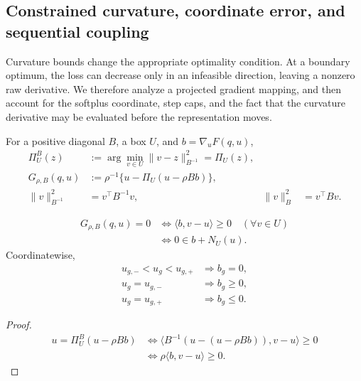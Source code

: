 \subsection{Constrained curvature, coordinate error, and sequential coupling}
Curvature bounds change the appropriate optimality condition. At a boundary optimum, the loss can decrease only in an infeasible direction, leaving a nonzero raw derivative. We therefore analyze a projected gradient mapping, and then account for the softplus coordinate, step caps, and the fact that the curvature derivative may be evaluated before the representation moves.
\begin{definition}
For a positive diagonal $B$, a box $U$, and $b=\nabla_uF(q,u)$,
\begin{align}
 \Pi_U^B(z)&:=\arg\min_{v\in U}\|v-z\|_{B^{-1}}^2=\Pi_U(z),\\
 G_{\rho,B}(q,u)&:=\rho^{-1}\{u-\Pi_U(u-\rho Bb)\},\\
 \|v\|_{B^{-1}}^2&=v^\top B^{-1}v,&\|v\|_B^2&=v^\top Bv.
\end{align}
\end{definition}
\begin{proposition}
\begin{align}
 G_{\rho,B}(q,u)=0
 &\Longleftrightarrow\langle b,v-u\rangle\ge0\quad(\forall v\in U)\\
 &\Longleftrightarrow0\in b+N_U(u).
\end{align}
Coordinatewise,
\begin{align}
 u_{g,-}<u_g<u_{g,+}&\Longrightarrow b_g=0,\\
 u_g=u_{g,-}&\Longrightarrow b_g\ge0,\\
 u_g=u_{g,+}&\Longrightarrow b_g\le0.
\end{align}
\end{proposition}
\begin{proof}
\begin{align}
 u=\Pi_U^B(u-\rho Bb)
 &\Longleftrightarrow
 \langle B^{-1}(u-(u-\rho Bb)),v-u\rangle\ge0\\
 &\Longleftrightarrow\rho\langle b,v-u\rangle\ge0.
\end{align}
\end{proof}

